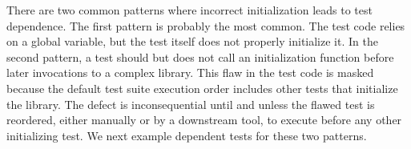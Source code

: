 There are two common patterns where incorrect
initialization leads to test dependence.
The first pattern is probably the most common. 
The test code relies on a
global variable, but the test itself does
not properly initialize it.  In the second pattern,
a test should but does not call
an initialization function before later invocations to a complex library.
This flaw in the test code is masked because the default test suite execution
order includes other tests that initialize the library.  The defect is
inconsequential until and unless the flawed test is reordered, either manually or by
a downstream tool, to execute before any other initializing test.
We next example dependent tests for these two patterns.



\newcommand{\jodatime}{JodaTime\xspace}
%



%


%


